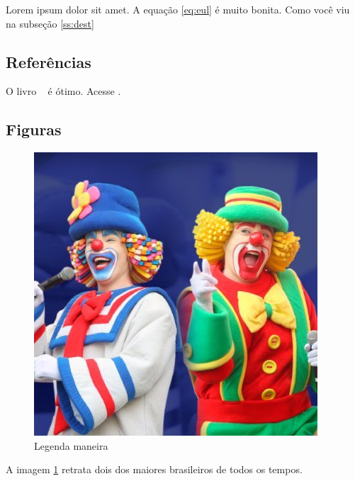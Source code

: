 \documentclass{article}
\begin{document}
    
    Lorem ipsum dolor sit amet. A equação \eqref{eq:eul} é muito bonita. Como você viu na subseção \ref{ss:dest}
    
    \subsection{Referências}
    
    O livro ~\cite{stewart2020} é ótimo. Acesse \cite{salles}.
    

    {}
    
    
    \subsection{Figuras}
    
    \begin{figure}[!h]
        \centering
        \includegraphics[width=.5\textwidth]{patati.jpg}
        \caption{Legenda maneira}
        \label{fig:massa}
    \end{figure}
    
    A imagem \ref{fig:massa} retrata dois dos maiores brasileiros de todos os tempos.
\end{document}
